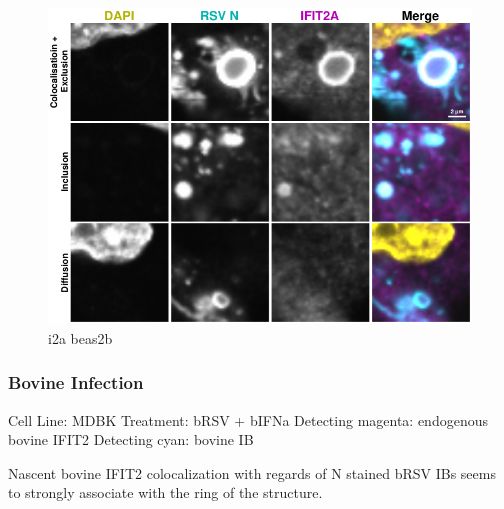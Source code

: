 \begin{figure}
    \centering
    \includegraphics[width=1\linewidth]{10. Chapter 5/Figs/01. Infection/01. IFIT2A/12. i2a beas2b.pdf}
    \caption[i2a beas2b]{i2a beas2b}
    \label{fig:i2a beas2b}
\end{figure}

\subsubsection{Bovine Infection}
Cell Line: MDBK \newline
Treatment: bRSV + bIFNa \newline
Detecting magenta: endogenous bovine IFIT2  \newline
Detecting cyan: bovine IB \newline

Nascent bovine IFIT2 colocalization with regards of N stained bRSV IBs seems to strongly associate with the ring of the structure.

